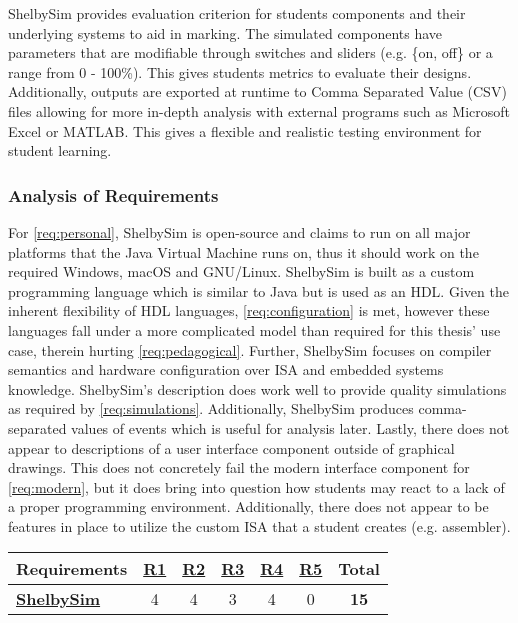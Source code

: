 ShelbySim provides evaluation criterion for students components and their underlying systems to aid in marking. The simulated components have parameters that are modifiable through switches and sliders (e.g. \{on, off\} or a range from 0 - 100\%). This gives students metrics to evaluate their designs. Additionally, outputs are exported at runtime to Comma Separated Value (CSV) files allowing for more in-depth analysis with external programs such as Microsoft Excel or MATLAB. This gives a flexible and realistic testing environment for student learning. 

\subsubsection*{Analysis of Requirements}

For \cref{req:personal}, ShelbySim is open-source and claims to run on all major platforms that the Java Virtual Machine runs on, thus it should work on the required Windows, macOS and GNU/Linux. ShelbySim is built as a custom programming language which is similar to Java but is used as an HDL. Given the inherent flexibility of HDL languages, \cref{req:configuration} is met, however these languages fall under a more complicated model than required for this thesis' use case, therein hurting \cref{req:pedagogical}. Further, ShelbySim focuses on compiler semantics and hardware configuration over ISA and embedded systems knowledge.  ShelbySim's description does work well to provide quality simulations as required by \cref{req:simulations}. Additionally, ShelbySim produces comma-separated values of events which is useful for analysis later. Lastly, there does not appear to descriptions of a user interface component outside of graphical drawings. This does not concretely fail the modern interface component for \cref{req:modern}, but it does bring into question how students may react to a lack of a proper programming environment. Additionally, there does not appear to be features in place to utilize the custom ISA that a student creates (e.g. assembler).

\begin{table}[h!]
    \centering
    \begin{tabular}{l|cccccc}
        \textbf{Requirements} & \textbf{\hyperref[req:personal]{R1}} & \textbf{\hyperref[req:configuration]{R2}} & \textbf{\hyperref[req:pedagogical]{R3}} & \textbf{\hyperref[req:simulations]{R4}} & \textbf{\hyperref[req:modern]{R5}} & \textbf{Total} \\ \hline
        \textbf{\hyperref[sec:review-shelbysim]{ShelbySim} \cite{Tappan2009, Tappan2009-2}} & 4                                  & 4                                    & 3                            & 4                                  & 0                             & \textbf{15}    \\
    \end{tabular}
\end{table}

